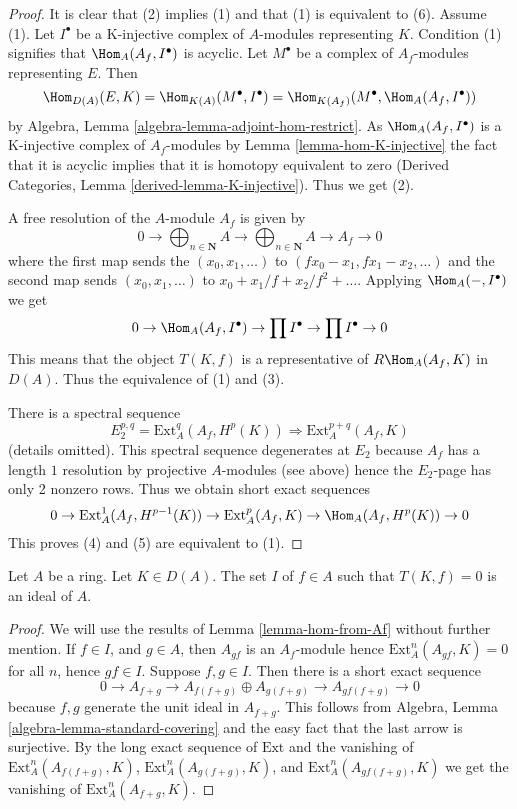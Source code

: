 \begin{proof}
It is clear that (2) implies (1) and that (1) is equivalent to (6). Assume (1).
Let $I^\bullet$ be a K-injective complex of $A$-modules representing $K$.
Condition (1) signifies that $\Hom_A(A_f, I^\bullet)$ is acyclic.
Let $M^\bullet$ be a complex of $A_f$-modules representing $E$.
Then
$$
\Hom_{D(A)}(E, K) =
\Hom_{K(A)}(M^\bullet, I^\bullet) =
\Hom_{K(A_f)}(M^\bullet, \Hom_A(A_f, I^\bullet))
$$
by Algebra, Lemma \ref{algebra-lemma-adjoint-hom-restrict}.
As $\Hom_A(A_f, I^\bullet)$ is a K-injective complex of
$A_f$-modules by Lemma \ref{lemma-hom-K-injective}
the fact that it is acyclic implies that it is homotopy equivalent to zero
(Derived Categories, Lemma \ref{derived-lemma-K-injective}).
Thus we get (2).

\medskip\noindent
A free resolution of the $A$-module $A_f$ is given by
$$
0 \to \bigoplus\nolimits_{n \in \mathbf{N}} A \to
\bigoplus\nolimits_{n \in \mathbf{N}} A
\to A_f \to 0
$$
where the first map sends the $(x_0, x_1, \ldots)$ to
$(fx_0 - x_1, fx_1 - x_2, \ldots)$ and the second map sends
$(x_0, x_1, \ldots)$ to $x_0 + x_1/f + x_2/f^2 + \ldots$.
Applying $\Hom_A(-, I^\bullet)$ we get
$$
0 \to \Hom_A(A_f, I^\bullet) \to \prod I^\bullet \to \prod I^\bullet \to 0
$$
This means that the object $T(K, f)$ is a representative of
$R\Hom_A(A_f, K)$ in $D(A)$. Thus the equivalence of (1) and (3).

\medskip\noindent
There is a spectral sequence
$$
E_2^{p, q} = \text{Ext}^q_A(A_f, H^p(K)) \Rightarrow
\text{Ext}^{p + q}_A(A_f, K)
$$
(details omitted). This spectral sequence degenerates at $E_2$ because
$A_f$ has a length $1$ resolution by projective $A$-modules (see above)
hence the $E_2$-page has only 2 nonzero rows. Thus we obtain short exact
sequences
$$
0 \to \text{Ext}^1_A(A_f, H^{p - 1}(K)) \to \text{Ext}^p_A(A_f, K)
\to \Hom_A(A_f, H^p(K)) \to 0
$$
This proves (4) and (5) are equivalent to (1).
\end{proof}

\begin{lemma}
\label{lemma-ideal-of-elements-complete-wrt}
Let $A$ be a ring. Let $K \in D(A)$. The set $I$ of $f \in A$ such that
$T(K, f) = 0$ is an ideal of $A$.
\end{lemma}

\begin{proof}
We will use the results of Lemma \ref{lemma-hom-from-Af}
without further mention.
If $f \in I$, and $g \in A$, then $A_{gf}$ is an $A_f$-module
hence $\text{Ext}^n_A(A_{gf}, K) = 0$ for all $n$, hence $gf \in I$.
Suppose $f, g \in I$. Then there is a short exact sequence
$$
0 \to A_{f + g} \to A_{f(f + g)} \oplus A_{g(f + g)} \to A_{gf(f + g)} \to 0
$$
because $f, g$ generate the unit ideal in $A_{f + g}$. This follows from
Algebra, Lemma \ref{algebra-lemma-standard-covering}
and the easy fact that the last arrow is surjective.
By the long exact sequence of $\text{Ext}$
and the vanishing of
$\text{Ext}^n_A(A_{f(f + g)}, K)$,
$\text{Ext}^n_A(A_{g(f + g)}, K)$, and
$\text{Ext}^n_A(A_{gf(f + g)}, K)$
we get the vanishing of 
$\text{Ext}^n_A(A_{f + g}, K)$.
\end{proof}

